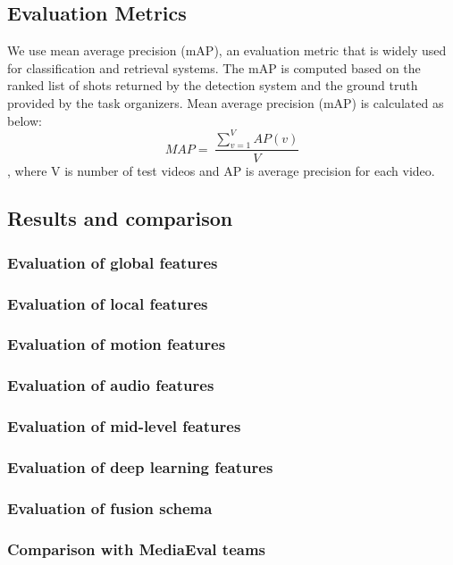 \documentclass[review]{elsarticle}
\begin{document}
\subsection{Evaluation Metrics}
We use mean average precision (mAP), an evaluation metric that is widely used for classification and retrieval systems. The mAP is computed based on the ranked list of shots returned by the detection system and the ground truth provided by the task organizers. Mean average precision (mAP) is calculated as below:
\[
MAP=\ \frac{\sum_{v=1}^VAP(v)}{V}
\]
, where V is number of test videos and AP is average precision for each video.
\subsection{Results and comparison}
\subsubsection{Evaluation of global features}
\subsubsection{Evaluation of local features}
\subsubsection{Evaluation of motion features}
\subsubsection{Evaluation of audio features}
\subsubsection{Evaluation of mid-level features}
\subsubsection{Evaluation of deep learning features}
\subsubsection{Evaluation of fusion schema}
\subsubsection{Comparison with MediaEval teams}
\end{document}
